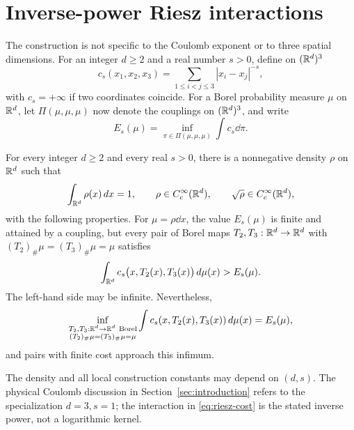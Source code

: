 \section{Inverse-power Riesz interactions}\label{sec:riesz}

The construction is not specific to the Coulomb exponent or to three
spatial dimensions. For an integer \(d\ge2\) and a real number \(s>0\),
define on \((\mathbb R^d)^3\)
\begin{equation}\label{eq:riesz-cost}
 c_s(x_1,x_2,x_3)=\sum_{1\le i<j\le3}|x_i-x_j|^{-s},
\end{equation}
with \(c_s=+\infty\) if two coordinates coincide. For a Borel probability
measure \(\mu\) on \(\mathbb R^d\), let \(\Pi(\mu,\mu,\mu)\) now denote the
couplings on \((\mathbb R^d)^3\), and write
\[
 E_s(\mu)=\inf_{\pi\in\Pi(\mu,\mu,\mu)}\int c_s\dd\pi.
\]

\begin{theorem}\label{thm:riesz}
For every integer \(d\ge2\) and every real \(s>0\), there is a
nonnegative density \(\rho\) on \(\mathbb R^d\) such that
\[
 \int_{\mathbb R^d}\rho(x)\,d x=1,\qquad
 \rho\in C_c^\infty(\mathbb R^d),\qquad
 \sqrt{\rho}\in C_c^\infty(\mathbb R^d),
\]
with the following properties. For \(\mu=\rho\dd x\), the value
\(E_s(\mu)\) is finite and attained by a coupling, but every pair of
Borel maps \(T_2,T_3:\mathbb R^d\to\mathbb R^d\) with
\((T_2)_\#\mu=(T_3)_\#\mu=\mu\) satisfies
\[
 \int_{\mathbb R^d}c_s\bigl(x,T_2(x),T_3(x)\bigr)\,d\mu(x)>E_s(\mu).
\]
The left-hand side may be infinite.
Nevertheless,
\[
 \inf_{\substack{T_2,T_3:\R^d\to\R^d\ \mathrm{Borel}\\
                 (T_2)_\#\mu=(T_3)_\#\mu=\mu}}
 \int c_s(x,T_2(x),T_3(x))\dd\mu(x)=E_s(\mu),
\]
and pairs with finite cost approach this infimum.
\end{theorem}

The density and all local construction constants may depend on
\((d,s)\). The physical Coulomb discussion in
Section~\ref{sec:introduction} refers to the specialization
\(d=3,s=1\); the interaction in \eqref{eq:riesz-cost} is the stated
inverse power, not a logarithmic kernel.

